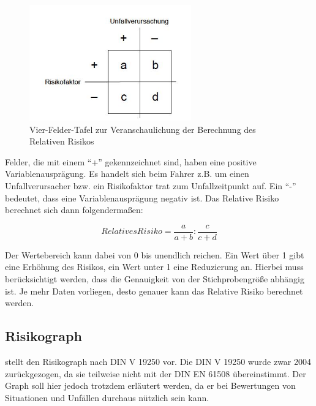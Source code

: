 \begin{savenotes}
	\begin{figure}[H]
		\centering
		\includegraphics[width=7cm,height=5cm]{figures/Relatives_Risiko}
		\caption[Vier-Felder-Tafel zur Veranschaulichung der Berechnung des Relativen Risikos]{Vier-Felder-Tafel zur Veranschaulichung der Berechnung des Relativen Risikos \parencite[S. 113]{Grundl.2005}}\label{fig:Relatives Risiko}
	\end{figure}
\end{savenotes}

Felder, die mit einem \enquote{+} gekennzeichnet sind, haben eine positive Variablenausprägung. Es handelt sich beim Fahrer z.B. um einen Unfallverursacher bzw. ein Risikofaktor trat zum Unfallzeitpunkt auf. Ein \enquote{-} bedeutet, dass eine Variablenausprägung negativ ist. Das Relative Risiko berechnet sich dann folgendermaßen:

\begin{equation}
	Relatives Risiko = \dfrac{a}{a+b}:\dfrac{c}{c+d}
\end{equation}

Der Wertebereich kann dabei von 0 bis unendlich reichen. Ein Wert über 1 gibt eine Erhöhung des Risikos, ein Wert unter 1 eine Reduzierung an. Hierbei muss berücksichtigt werden, dass die Genauigkeit von der Stichprobengröße abhängig ist. Je mehr Daten vorliegen, desto genauer kann das Relative Risiko berechnet werden.

\subsection{Risikograph}\label{subsection:Risikograph}
\Textcite[S. 50f]{Hillenbrand.2012} stellt den Risikograph nach DIN V 19250 vor. Die DIN V 19250 wurde zwar 2004 zurückgezogen, da sie teilweise nicht mit der DIN EN 61508 übereinstimmt. Der Graph soll hier jedoch trotzdem erläutert werden, da er bei Bewertungen von Situationen und Unfällen durchaus nützlich sein kann.

